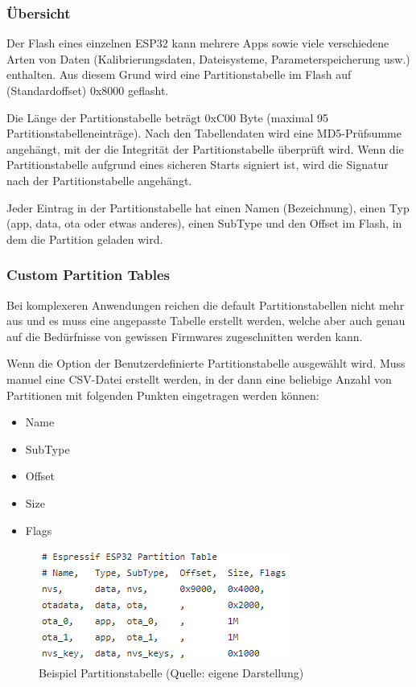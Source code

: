 
\subsubsection{Übersicht}
Der Flash eines einzelnen ESP32 kann mehrere Apps sowie viele verschiedene Arten von Daten (Kalibrierungsdaten, Dateisysteme, Parameterspeicherung usw.) enthalten. Aus diesem Grund wird eine Partitionstabelle im Flash auf (Standardoffset) 0x8000 geflasht.

Die Länge der Partitionstabelle beträgt 0xC00 Byte (maximal 95 Partitionstabelleneinträge). Nach den Tabellendaten wird eine MD5-Prüfsumme angehängt, mit der die Integrität der Partitionstabelle überprüft wird. Wenn die Partitionstabelle aufgrund eines sicheren Starts signiert ist, wird die Signatur nach der Partitionstabelle angehängt.

Jeder Eintrag in der Partitionstabelle hat einen Namen (Bezeichnung), einen Typ (app, data, ota oder etwas anderes), einen SubType und den Offset im Flash, in dem die Partition geladen wird.

\subsubsection{Custom Partition Tables}
Bei komplexeren Anwendungen reichen die default Partitionstabellen nicht mehr aus und es muss eine angepasste Tabelle erstellt werden, welche aber auch genau auf die Bedürfnisse von gewissen Firmwares zugeschnitten werden kann.

Wenn die Option der Benutzerdefinierte Partitionstabelle ausgewählt wird. Muss manuel eine CSV-Datei erstellt werden, in der dann eine beliebige Anzahl von Partitionen mit folgenden Punkten eingetragen werden können:

\begin{itemize}
    \item Name
    \item SubType
    \item Offset
    \item Size
    \item Flags
\end{itemize}

\begin{figure}[H]
    \begin{center}
        \includegraphics[scale=1]{images/partition_table.png}
        \caption{Beispiel Partitionstabelle (Quelle: eigene Darstellung)}
    \end{center}    
\end{figure}

